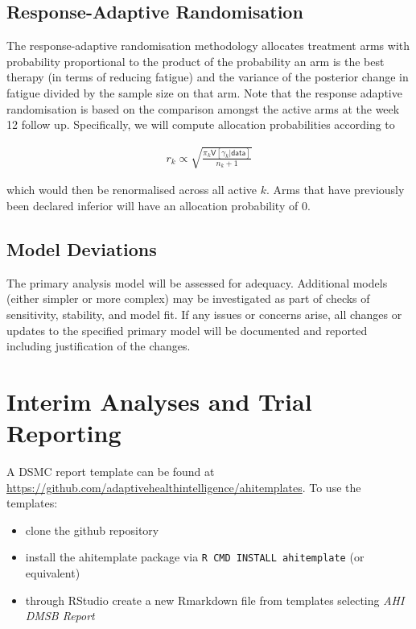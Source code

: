 \documentclass[
]{article}
\begin{document}
\hypertarget{response-adaptive-randomisation}{%
  \subsection{Response-Adaptive Randomisation}\label{response-adaptive-randomisation}}

The response-adaptive randomisation methodology allocates treatment arms with probability proportional to the product of the probability an arm is the best therapy (in terms of reducing fatigue) and the variance of the posterior change in fatigue divided by the sample size on that arm.
Note that the response adaptive randomisation is based on the comparison amongst the active arms at the week 12 follow up.
Specifically, we will compute allocation probabilities according to

\[
  \begin{aligned}
    r_{k} \propto \sqrt{ \frac{\pi_k \mathsf{V}[\gamma_k | \mathsf{data} ]}{ n_k + 1}  }
  \end{aligned}
\]

which would then be renormalised across all active $k$.
Arms that have previously been declared inferior will have an allocation probability of $0$.


\hypertarget{model-deviations}{%
  \subsection{Model Deviations}\label{model-deviations}}

The primary analysis model will be assessed for adequacy.
Additional models (either simpler or more complex) may be investigated as part of checks of sensitivity, stability, and model fit.
If any issues or concerns arise, all changes or updates to the specified primary model will be documented and reported including justification of the changes.

\clearpage

\hypertarget{interim-analyses-and-trial-reporting}{%
  \section{Interim Analyses and Trial Reporting}\label{interim-analyses-and-trial-reporting}}

A DSMC report template can be found at \url{https://github.com/adaptivehealthintelligence/ahitemplates}.
To use the templates:

\begin{itemize}
  \item clone the github repository
  \item install the ahitemplate package via \texttt{R CMD INSTALL ahitemplate} (or equivalent)
  \item through RStudio create a new Rmarkdown file from templates selecting \textit{AHI DMSB Report}
\end{itemize}
\end{document}
